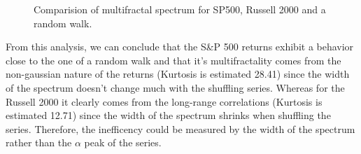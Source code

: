 \documentclass[11pt]{extarticle}
\begin{document}
\begin{figure}[htbp]
    \centering
    \caption{Comparision of multifractal spectrum for SP500, Russell 2000 and a random walk.}
\end{figure}

\FloatBarrier

From this analysis, we can conclude that the S\&P 500 returns exhibit a behavior close to the one of a random walk and
that it's multifractality comes from the non-gaussian nature of the returns (Kurtosis is estimated 28.41) since the width
of the spectrum doesn't change much with the shuffling series. Whereas for the Russell 2000 it clearly comes from the long-range
correlations (Kurtosis is estimated 12.71) since the width of the spectrum shrinks when shuffling the series.
Therefore, the inefficency could be measured by the width of the spectrum rather than the $\alpha$ peak of the series.
\end{document}
